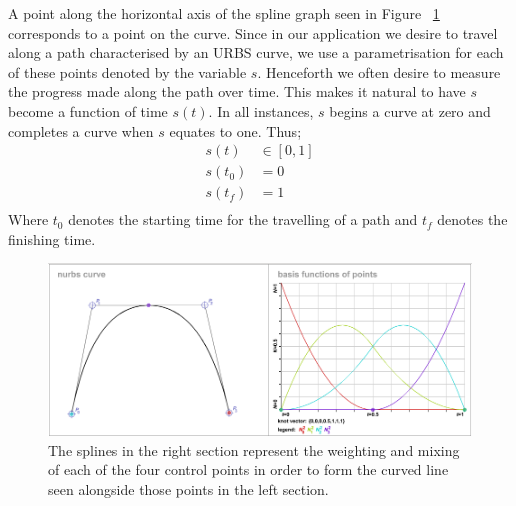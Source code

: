 A point along the horizontal axis of the spline graph seen in Figure ~\ref{fig:urbsDemo} corresponds to a point on the curve. Since in our application we desire to travel along a path characterised by an URBS curve, we use a parametrisation for each of these points denoted by the variable $s$. Henceforth we often desire to measure the progress made along the path over time. This makes it natural to have $s$ become a function of time $s(t)$. In all instances, $s$ begins a curve at zero and completes a curve when $s$ equates to one. Thus;
\begin{align*}
s(t) &\in [0,1]\\
s(t_0) &= 0\\
s(t_f) &= 1\\
\end{align*}
Where $t_0$ denotes the starting time for the travelling of a path and $t_f$ denotes the finishing time.


\begin{figure}  
\includegraphics[width=\textwidth]{figures/systemDesign/urbsDemo.png}
\caption[3rd order (Quadratic) URBS curve and corresponding basis splines]{The splines in the right section represent the weighting and mixing of each of the four control points in order to form the curved line seen alongside those points in the left section.\cite{website:nurbsDemo}} 
\label{fig:urbsDemo}
\end{figure}
